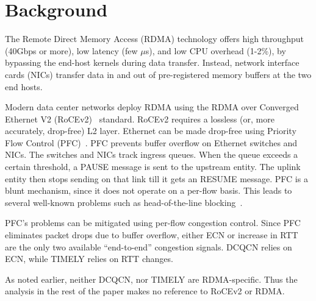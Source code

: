 \section{Background}
The Remote Direct Memory Access (RDMA) technology offers high throughput (40Gbps
or more), low latency (few $\mu$s), and low CPU overhead (1-2\%), by bypassing
the end-host kernels during data transfer. Instead, network interface cards
(NICs) transfer data in and out of pre-registered memory buffers at the two end
hosts.

Modern data center networks deploy RDMA using the RDMA over Converged Ethernet
V2 (RoCEv2)~\cite{rocev2} standard.  RoCEv2 requires a lossless (or, more
accurately, drop-free) L2 layer. Ethernet can be made drop-free using Priority
Flow Control (PFC)~\cite{pfc}. PFC prevents buffer overflow on Ethernet switches
and NICs. The switches and NICs track ingress queues. When the queue exceeds a
certain threshold, a PAUSE message is sent to the upstream entity. The uplink
entity then stops sending on that link till it gets an RESUME message.  PFC is a
blunt mechanism, since it does not operate on a per-flow basis. This leads to
several well-known problems such as head-of-the-line
blocking~\cite{dcqcn,tcp-bolt}. 

PFC's problems can be mitigated using per-flow congestion control. Since PFC
eliminates packet drops due to buffer overflow, either ECN or increase in RTT
are the only two available ``end-to-end'' congestion signals.  DCQCN relies on
ECN, while TIMELY relies on RTT changes.

As noted earlier, neither DCQCN, nor TIMELY are RDMA-specific. Thus the analysis
in the rest of the paper makes no reference to RoCEv2 or RDMA.
